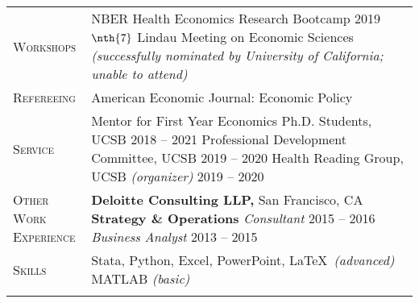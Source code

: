\documentclass[11pt]{article}
\begin{document}
\begin{tabularx}{\textwidth}{@{}Y Z@{}}
	\textsc{Workshops} & 
	NBER Health Economics Research Bootcamp \hfill 2019%
	\vspace{6pt} \newline
	$\nth{7}$ Lindau Meeting on Economic Sciences \newline \textit{(successfully nominated by University of California; unable to attend)} 
	\\ \addlinespace[20pt] 
	
	\textsc{Refereeing}  & 
	American Economic Journal: Economic Policy
	 \\ \addlinespace[20pt] 
	
	\textsc{Service} & 
	Mentor for First Year Economics Ph.D. Students, UCSB \hfill 2018 -- 2021%
	\vspace{3pt} \newline
	Professional Development Committee, UCSB \hfill 2019 -- 2020%
	\vspace{3pt} \newline
	Health Reading Group, UCSB \textit{(organizer)} \hfill 2019 -- 2020%
	\\ \addlinespace[20pt] 
	
	
	\textsc{Other Work \newline Experience}  & 
	\textbf{Deloitte Consulting LLP,} San Francisco, CA
	\vspace{0pt} \newline
	\textbf{Strategy \& Operations} 
	\vspace{3pt} \newline
	\textit{Consultant} \hfill 2015 -- 2016%
	\vspace{0pt} \newline
	\textit{Business Analyst} \hfill 2013 -- 2015%
	\\ \addlinespace[20pt] 
	
	\textsc{Skills}  & 
	Stata, Python, Excel, PowerPoint, \LaTeX \ \textit{(advanced)}
	\vspace{3pt} \newline
	MATLAB \textit{(basic)}
	\\ \addlinespace[20pt] 
	

\end{tabularx}
\end{document}
